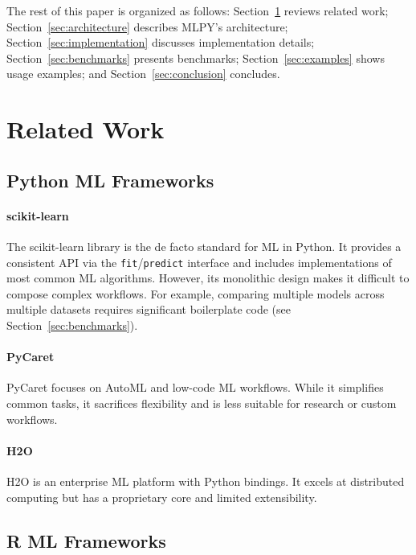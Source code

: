 \documentclass[twoside,11pt]{article}
\begin{document}
The rest of this paper is organized as follows: Section~\ref{sec:related}
reviews related work; Section~\ref{sec:architecture} describes MLPY's
architecture; Section~\ref{sec:implementation} discusses implementation details;
Section~\ref{sec:benchmarks} presents benchmarks; Section~\ref{sec:examples}
shows usage examples; and Section~\ref{sec:conclusion} concludes.

\section{Related Work}
\label{sec:related}

\subsection{Python ML Frameworks}

\paragraph{scikit-learn}
The scikit-learn library \citep{pedregosa2011scikit} is the de facto standard
for ML in Python. It provides a consistent API via the \texttt{fit}/\texttt{predict}
interface and includes implementations of most common ML algorithms. However,
its monolithic design makes it difficult to compose complex workflows. For
example, comparing multiple models across multiple datasets requires significant
boilerplate code (see Section~\ref{sec:benchmarks}).

\paragraph{PyCaret}
PyCaret \citep{pycaret} focuses on AutoML and low-code ML workflows. While it
simplifies common tasks, it sacrifices flexibility and is less suitable for
research or custom workflows.

\paragraph{H2O}
H2O \citep{h2o} is an enterprise ML platform with Python bindings. It excels at
distributed computing but has a proprietary core and limited extensibility.

\subsection{R ML Frameworks}
\end{document}

